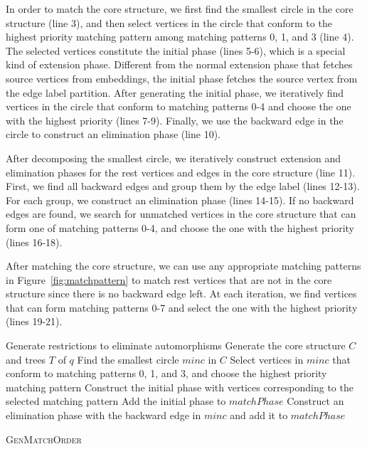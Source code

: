 In order to match the core structure, we first find the smallest circle in the core structure (line 3), and then select vertices in the circle that conform to the highest priority matching pattern among matching patterns 0, 1, and 3 (line 4). The selected vertices constitute the initial phase (lines 5-6), which is a special kind of extension phase. Different from the normal extension phase that fetches source vertices from embeddings, the initial phase fetches the source vertex from the edge label partition. After generating the initial phase, we iteratively find vertices in the circle that conform to matching patterns 0-4 and choose the one with the highest priority (lines 7-9). Finally, we use the backward edge in the circle to construct an elimination phase (line 10).

After decomposing the smallest circle, we iteratively construct extension and elimination phases for the rest vertices and edges in the core structure (line 11). First, we find all backward edges and group them by the edge label (lines 12-13). For each group, we construct an elimination phase (lines 14-15). If no backward edges are found, we search for unmatched vertices in the core structure that can form one of matching patterns 0-4, and choose the one with the highest priority (lines 16-18).

After matching the core structure, we can use any appropriate matching patterns in Figure~\ref{fig:matchpattern} to match rest vertices that are not in the core structure since there is no backward edge left. At each iteration, we find vertices that can form matching patterns 0-7 and select the one with the highest priority (lines 19-21).


\begin{algorithm}
	Generate restrictions to eliminate automorphisms\;
	Generate the core structure $C$ and trees $T$ of $q$\;
	Find the smallest circle $minc$ in $C$\;
	Select vertices in $minc$ that conform to matching patterns 0, 1, and 3, and choose the highest priority matching pattern\;
	Construct the initial phase with vertices corresponding to the selected matching pattern\;
	Add the initial phase to $matchPhase$\;
	Construct an elimination phase with the backward edge in $minc$ and add it to $matchPhase$\;
	\caption{\textsc{GenMatchOrder}}
	\label{algo:genmatchorder}
\end{algorithm}


